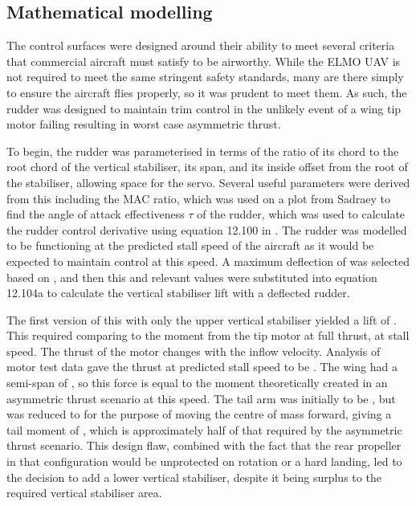 \documentclass[../../main.tex]{subfiles}
\begin{document}
\subsection{Mathematical modelling} \label{sec:final-design-proposal:control-surfaces:mathematical-modelling}


The control surfaces were designed around their ability to meet several criteria that commercial aircraft must satisfy to be airworthy.
While the ELMO UAV is not required to meet the same stringent safety standards, many are there simply to ensure the aircraft flies properly, so it was prudent to meet them.
As such, the rudder was designed to maintain trim control in the unlikely event of a wing tip motor failing resulting in worst case asymmetric thrust.  

To begin, the rudder was parameterised in terms of the ratio of its chord to the root chord of the vertical stabiliser, its span, and its inside offset from the root of the stabiliser, allowing space for the servo.
Several useful parameters were derived from this including the MAC ratio, which was used on a plot from Sadraey \cite{sadraey-13} to find the angle of attack effectiveness $\tau$ of the rudder, which was used to calculate the rudder control derivative using equation 12.100 in \cite{sadraey-13}.
The rudder was modelled to be functioning at the predicted stall speed of the aircraft as it would be expected to maintain control at this speed.
A maximum deflection of  was selected based on \cite{sadraey-13}, and then this and relevant values were substituted into equation 12.104a \cite{sadraey-13} to calculate the vertical stabiliser lift with a deflected rudder. 

The first version of this with only the upper vertical stabiliser yielded a lift of .
This required comparing to the moment from the tip motor at full thrust, at stall speed.
The thrust of the motor changes with the inflow velocity.
Analysis of motor test data gave the thrust at predicted stall speed to be .
The wing had a semi-span of , so this force is equal to the moment theoretically created in an asymmetric thrust scenario at this speed.
The tail arm was initially to be , but was reduced to  for the purpose of moving the centre of mass forward, giving a tail moment of , which is approximately half of that required by the asymmetric thrust scenario.
This design flaw, combined with the fact that the rear propeller in that configuration would be unprotected on rotation or a hard landing, led to the decision to add a lower vertical stabiliser, despite it being surplus to the required vertical stabiliser area. 
\end{document}
